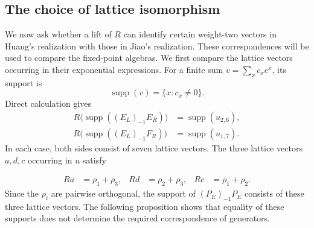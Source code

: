 \documentclass[11pt,reqno]{amsart}
\theoremstyle{definition}\newtheorem{definition}[theorem]{Definition}
\theoremstyle{remark}\newtheorem{remark}[theorem]{Remark}
\numberwithin{equation}{section}
\begin{document}
\subsection{The choice of lattice isomorphism}
\leavevmode
\begingroup
We now ask whether a lift of $R$ can identify certain weight-two vectors in Huang's realization with those in Jiao's realization. These correspondences will be used to compare the fixed-point algebras. We first compare the lattice vectors occurring in their exponential expressions. For a finite sum $v=\sum_x c_xe^x$, its support is
\[
 \operatorname{supp}(v)=\{x:c_x\ne0\}.
\]
Direct calculation gives
\[
 \begin{aligned}
 R\bigl(\operatorname{supp}((E_L)_{-1}E_R)\bigr)
   &=\operatorname{supp}(u_{2,6}),\\
 R\bigl(\operatorname{supp}((E_L)_{-1}F_R)\bigr)
   &=\operatorname{supp}(u_{1,7}).
 \end{aligned}
\]
In each case, both sides consist of seven lattice vectors. The three lattice vectors $a,d,c$ occurring in $u$ satisfy
\par\endgroup
\begin{align}
 Ra&=\rho_1+\rho_3,& Rd&=\rho_2+\rho_3,& Rc&=\rho_1+\rho_2.
\end{align}
\begingroup
Since the $\rho_i$ are pairwise orthogonal, the support of $(P_E)_{-1}P_E$ consists of these three lattice vectors. The following proposition shows that equality of these supports does not determine the required correspondence of generators.
\par\endgroup
\end{document}
